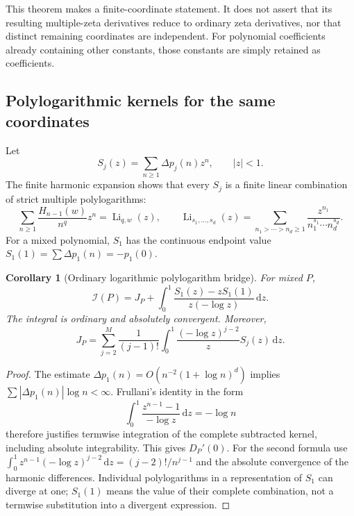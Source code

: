 \documentclass[11pt,a4paper]{article}
\numberwithin{equation}{section}
\newtheorem{corollary}[theorem]{Corollary}
\theoremstyle{definition}
\theoremstyle{remark}
\DeclareMathOperator{\Li}{Li}
\newcommand{\dd}{\,\mathrm d}
\newcommand{\cI}{\mathcal I}
\begin{document}
This theorem makes a finite-coordinate statement. It does not assert
that its resulting multiple-zeta derivatives reduce to ordinary zeta
derivatives, nor that distinct remaining coordinates are independent.
For polynomial coefficients already containing other constants, those
constants are simply retained as coefficients.

\subsection{Polylogarithmic kernels for the same coordinates}

Let
\begin{equation}\label{poly:S}
 S_j(z)=\sum_{n\ge1}\Delta p_j(n)z^n,\qquad |z|<1.
\end{equation}
The finite harmonic expansion shows that every $S_j$ is a finite linear
combination of strict multiple polylogarithms:
\[
 \sum_{n\ge1}\frac{H_{n-1}(w)}{n^q}z^n=\Li_{q,w}(z),
 \qquad
 \Li_{s_1,\ldots,s_d}(z)=
 \sum_{n_1>\cdots>n_d\ge1}\frac{z^{n_1}}{n_1^{s_1}\cdots n_d^{s_d}}.
\]
For a mixed polynomial, $S_1$ has the continuous endpoint value
$S_1(1)=\sum\Delta p_1(n)=-p_1(0)$.

\begin{corollary}[Ordinary logarithmic polylogarithm bridge]
\label{poly:polylog}
For mixed $P$,
\begin{equation}\label{poly:polylogeq}
 \boxed{\displaystyle
 \cI(P)=J_P+\int_0^1
 \frac{S_1(z)-zS_1(1)}{z(-\log z)}\dd z.}
\end{equation}
The integral is ordinary and absolutely convergent. Moreover,
\begin{equation}\label{poly:Jpolylog}
 J_P=\sum_{j=2}^M\frac1{(j-1)!}
 \int_0^1\frac{(-\log z)^{j-2}}z S_j(z)\dd z.
\end{equation}
\end{corollary}
\begin{proof}
The estimate $\Delta p_1(n)=O(n^{-2}(1+\log n)^d)$ implies
$\sum |\Delta p_1(n)|\log n<\infty$. Frullani's identity in the
form
\[
 \int_0^1\frac{z^{n-1}-1}{-\log z}\dd z=-\log n
\]
therefore justifies termwise integration of the complete subtracted
kernel, including absolute integrability. This gives $D_P'(0)$.
For the second formula use
$\int_0^1z^{n-1}(-\log z)^{j-2}\dd z=(j-2)!/n^{j-1}$
and the absolute convergence of the harmonic differences.
Individual polylogarithms in a representation of $S_1$ can diverge at
one; $S_1(1)$ means the value of their complete combination, not a
termwise substitution into a divergent expression.
\end{proof}
\end{document}
